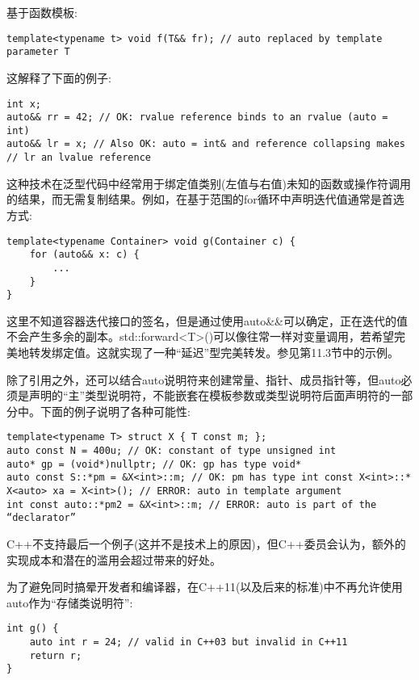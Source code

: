 基于函数模板:

\begin{lstlisting}[style=styleCXX]
template<typename t> void f(T&& fr); // auto replaced by template parameter T
\end{lstlisting}

这解释了下面的例子:

\begin{lstlisting}[style=styleCXX]
int x;
auto&& rr = 42; // OK: rvalue reference binds to an rvalue (auto = int)
auto&& lr = x; // Also OK: auto = int& and reference collapsing makes
// lr an lvalue reference
\end{lstlisting}

这种技术在泛型代码中经常用于绑定值类别(左值与右值)未知的函数或操作符调用的结果，而无需复制结果。例如，在基于范围的for循环中声明迭代值通常是首选方式:

\begin{lstlisting}[style=styleCXX]
template<typename Container> void g(Container c) {
	for (auto&& x: c) {
		...
	}
}
\end{lstlisting}

这里不知道容器迭代接口的签名，但是通过使用auto\&\&可以确定，正在迭代的值不会产生多余的副本。std::forward<T>()可以像往常一样对变量调用，若希望完美地转发绑定值。这就实现了一种“延迟”型完美转发。参见第11.3节中的示例。

除了引用之外，还可以结合auto说明符来创建常量、指针、成员指针等，但auto必须是声明的“主”类型说明符，不能嵌套在模板参数或类型说明符后面声明符的一部分中。下面的例子说明了各种可能性:

\begin{lstlisting}[style=styleCXX]
template<typename T> struct X { T const m; };
auto const N = 400u; // OK: constant of type unsigned int
auto* gp = (void*)nullptr; // OK: gp has type void*
auto const S::*pm = &X<int>::m; // OK: pm has type int const X<int>::*
X<auto> xa = X<int>(); // ERROR: auto in template argument
int const auto::*pm2 = &X<int>::m; // ERROR: auto is part of the “declarator”
\end{lstlisting}

C++不支持最后一个例子(这并不是技术上的原因)，但C++委员会认为，额外的实现成本和潜在的滥用会超过带来的好处。

为了避免同时搞晕开发者和编译器，在C++11(以及后来的标准)中不再允许使用auto作为“存储类说明符”:

\begin{lstlisting}[style=styleCXX]
int g() {
	auto int r = 24; // valid in C++03 but invalid in C++11
	return r;
}
\end{lstlisting}

